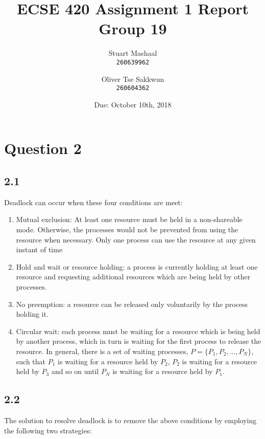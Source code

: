 \documentclass[11pt, letterpaper]{article}
\title{ECSE 420 Assignment 1 Report\\Group 19}
\author{
    Stuart Mashaal\\
    \texttt{260639962}
    \and
    Oliver Tse Sakkwun\\
    \texttt{260604362}
}
\date{Due: October 10th, 2018}
\begin{document}
\begin{titlepage}
    \maketitle
\end{titlepage}

\section*{Question 2}

\subsection*{2.1}

Deadlock can occur when these four conditions are meet:

\begin{enumerate}
    \item Mutual exclusion: At least one resource must be held in a non-shareable mode. Otherwise, the processes would not be prevented from using the resource when necessary. Only one process can use the resource at any given instant of time
    \item Hold and wait or resource holding: a process is currently holding at least one resource and requesting additional resources which are being held by other processes.
    \item No preemption: a resource can be released only voluntarily by the process holding it.
    \item Circular wait: each process must be waiting for a resource which is being held by another process, which in turn is waiting for the first process to release the resource. In general, there is a set of waiting processes, $P = \{P_1, P_2, ..., P_N\}$, such that $P_1$ is waiting for a resource held by $P_2$, $P_2$ is waiting for a resource held by $P_3$ and so on until $P_N$ is waiting for a resource held by $P_1$.
\end{enumerate}

\subsection*{2.2}

The solution to resolve deadlock is to remove the above conditions by employing the following two strategies:
\end{document}

